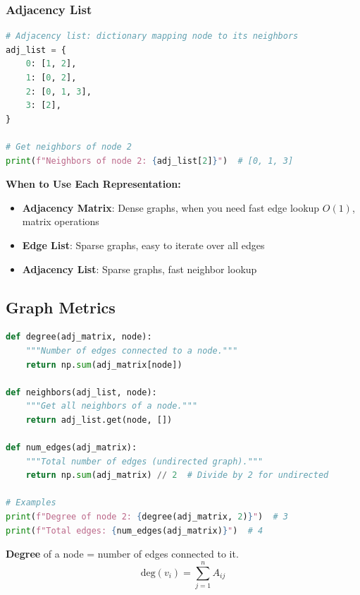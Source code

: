 \documentclass[12pt,a4paper]{article}
\begin{document}
\subsubsection{Adjacency List}

\begin{lstlisting}[language=Python,caption={Adjacency list representation}]
# Adjacency list: dictionary mapping node to its neighbors
adj_list = {
    0: [1, 2],
    1: [0, 2],
    2: [0, 1, 3],
    3: [2],
}

# Get neighbors of node 2
print(f"Neighbors of node 2: {adj_list[2]}")  # [0, 1, 3]
\end{lstlisting}

\begin{concept}
\textbf{When to Use Each Representation:}
\begin{itemize}
    \item \textbf{Adjacency Matrix}: Dense graphs, when you need fast edge lookup $O(1)$, matrix operations
    \item \textbf{Edge List}: Sparse graphs, easy to iterate over all edges
    \item \textbf{Adjacency List}: Sparse graphs, fast neighbor lookup
\end{itemize}
\end{concept}

\subsection{Graph Metrics}

\begin{lstlisting}[language=Python,caption={Basic graph metrics}]
def degree(adj_matrix, node):
    """Number of edges connected to a node."""
    return np.sum(adj_matrix[node])

def neighbors(adj_list, node):
    """Get all neighbors of a node."""
    return adj_list.get(node, [])

def num_edges(adj_matrix):
    """Total number of edges (undirected graph)."""
    return np.sum(adj_matrix) // 2  # Divide by 2 for undirected

# Examples
print(f"Degree of node 2: {degree(adj_matrix, 2)}")  # 3
print(f"Total edges: {num_edges(adj_matrix)}")  # 4
\end{lstlisting}

\begin{mathbox}
\textbf{Degree} of a node = number of edges connected to it.
\[
\text{deg}(v_i) = \sum_{j=1}^{n} A_{ij}
\]
\end{mathbox}
\end{document}
